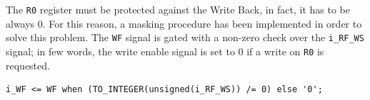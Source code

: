 The \texttt{R0} register must be protected against the Write Back, in fact, it has to be always 0. For this reason, a masking procedure has been implemented in order to solve this problem. The \texttt{WF} signal is gated with a non-zero check over the \texttt{i\_RF\_WS} signal; in few words, the write enable signal is set to 0 if a write on \texttt{R0} is requested.

\hfill
\begin{lstlisting}[style=vhdl,caption={VHDL code gating for the WS signal coming from the CU}]
    i_WF <= WF when (TO_INTEGER(unsigned(i_RF_WS)) /= 0) else '0';
\end{lstlisting}